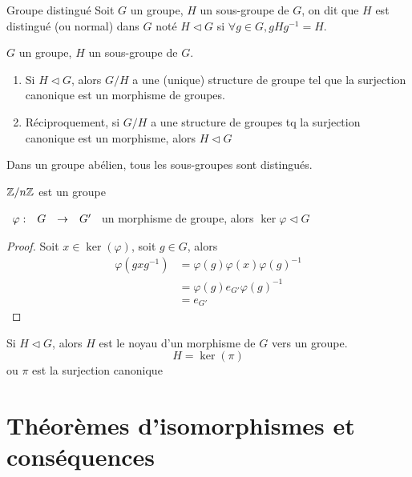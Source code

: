 \documentclass[]{report}
\begin{document}
\begin{df}{Groupe distingué}{}
    Soit $G$ un groupe, $H$ un sous-groupe de $G$, on dit que $H$ est distingué (ou normal) dans $G$ noté $H\triangleleft G$ si $\forall g\in G, gHg^{-1}=H$.
\end{df}

\begin{prop}{}{}
    $G$ un groupe, $H$ un sous-groupe de $G$.
    \begin{enumerate}
        \item Si $H\triangleleft G$, alors $G/H$ a une (unique) structure de groupe tel que la surjection canonique est un morphisme de groupes.
        \item Réciproquement, si $G/H$ a une structure de groupes tq la surjection canonique est un morphisme, alors $H\triangleleft G$
    \end{enumerate}
\end{prop}

\begin{re}{}{}
    Dans un groupe abélien, tous les sous-groupes sont distingués.
\end{re}

\begin{ex}{}{}
    $\mathbb{Z}/n\mathbb{Z}$ est un groupe
\end{ex}

\begin{prop}{}{}
    $\begin{array}{ccccc} \varphi : & G & \to & G' \end{array}$ un morphisme de groupe, alors $\ker \varphi \triangleleft G$
\end{prop}

\begin{proof}
    Soit $x\in \ker (\varphi)$, soit $g\in G$, alors
    \begin{align*}
        \varphi (g x g^{-1})&=\varphi(g)\varphi(x)\varphi(g)^{-1}\\
        &=\varphi (g) e_{G'} \varphi(g)^{-1}\\
        &=e_{G'}
    \end{align*}
\end{proof}

\begin{prop}{}{}
    Si $H\triangleleft G$, alors $H$ est le noyau d'un morphisme de $G$ vers un groupe.
    \[H=\ker (\pi)\]
    ou $\pi$ est la surjection canonique
\end{prop}

\section{Théorèmes d'isomorphismes et conséquences}
\end{document}
